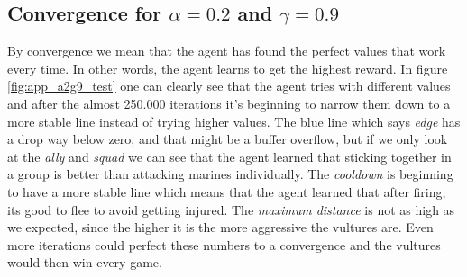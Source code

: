 
\subsection*{Convergence for $\alpha= 0.2$ and $\gamma = 0.9$}

By convergence we mean that the agent has found the perfect values that work every time. In other words, the agent learns to get the highest reward. In figure \ref{fig:app_a2g9_test} one can clearly see that the agent tries with different values and after the almost 250.000 iterations it's beginning to narrow them down to a more stable line instead of trying higher values. The blue line which says \textit{edge} has a drop way below zero, and that might be a buffer overflow, but if we only look at the \textit{ally} and \textit{squad} we can see that the agent learned that sticking together in a group is better than attacking marines individually. The \textit{cooldown} is beginning to have a more stable line which means that the agent learned that after firing, its good to flee to avoid getting injured. The \textit{maximum distance} is not as high as we expected, since the higher it is the more aggressive the vultures are. Even more iterations could perfect these numbers to a convergence and the vultures would then win every game. 


